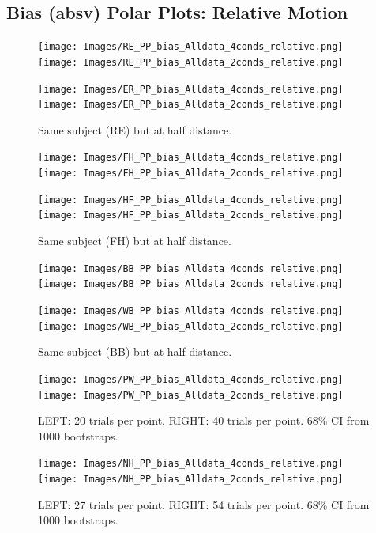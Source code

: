 \documentclass[11pt]{article} %
\begin{document}
\subsection{Bias (absv) Polar Plots: Relative Motion}
\begin{figure}[H]
\centering %
\texttt{[image: Images/RE\_PP\_bias\_Alldata\_4conds\_relative.png]}
\texttt{[image: Images/RE\_PP\_bias\_Alldata\_2conds\_relative.png]}
\end{figure}
\begin{figure}[H]
\centering %
\texttt{[image: Images/ER\_PP\_bias\_Alldata\_4conds\_relative.png]}
\texttt{[image: Images/ER\_PP\_bias\_Alldata\_2conds\_relative.png]}
\caption{Same subject (RE) but at half distance.}
\end{figure}
\begin{figure}[H]
\centering %
\texttt{[image: Images/FH\_PP\_bias\_Alldata\_4conds\_relative.png]}
\texttt{[image: Images/FH\_PP\_bias\_Alldata\_2conds\_relative.png]}
\end{figure}
\begin{figure}[H]
\centering %
\texttt{[image: Images/HF\_PP\_bias\_Alldata\_4conds\_relative.png]}
\texttt{[image: Images/HF\_PP\_bias\_Alldata\_2conds\_relative.png]}
\caption{Same subject (FH) but at half distance.}
\end{figure}
\begin{figure}[H]
\centering %
\texttt{[image: Images/BB\_PP\_bias\_Alldata\_4conds\_relative.png]}
\texttt{[image: Images/BB\_PP\_bias\_Alldata\_2conds\_relative.png]}
\end{figure}
\begin{figure}[H]
\centering %
\texttt{[image: Images/WB\_PP\_bias\_Alldata\_4conds\_relative.png]}
\texttt{[image: Images/WB\_PP\_bias\_Alldata\_2conds\_relative.png]}
\caption{Same subject (BB) but at half distance.}
\end{figure}
\begin{figure}[H]
\centering %
\texttt{[image: Images/PW\_PP\_bias\_Alldata\_4conds\_relative.png]}
\texttt{[image: Images/PW\_PP\_bias\_Alldata\_2conds\_relative.png]}
\caption{LEFT: 20 trials per point. RIGHT: 40 trials per point. 68\% CI from 1000 bootstraps.}
\end{figure}
\begin{figure}[H]
\centering %
\texttt{[image: Images/NH\_PP\_bias\_Alldata\_4conds\_relative.png]}
\texttt{[image: Images/NH\_PP\_bias\_Alldata\_2conds\_relative.png]}
\caption{LEFT: 27 trials per point. RIGHT: 54 trials per point. 68\% CI from 1000 bootstraps.}
\end{figure}
\end{document}

